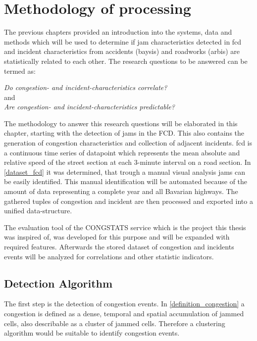\chapter{Methodology of processing}
\label{methodology}
The previous chapters provided an introduction into the systems, data and methods which will be used to determine if jam characteristics detected in \acrshort{fcd} and incident characteristics from accidents (\acrshort{baysis}) and roadworks (\acrshort{arbis}) are statistically related to each other. The research questions to be answered can be termed as:

\begin{center}
	\textit{Do congestion- and incident-characteristics correlate?} 
	\\
	\medskip
	and
	\medskip
	\\
	\textit{Are congestion- and incident-characteristics predictable?}
\end{center}

\medskip

The methodology to answer this research questions will be elaborated in this chapter, starting with the detection of jams in the FCD. This also contains the generation of congestion characteristics and collection of adjacent incidents. \acrshort{fcd} is a continuous time series of datapoint which represents the mean absolute and relative speed of the street section at each 3-minute interval on a road section. In \cref{dataset_fcd} it was determined, that trough a manual visual analysis jams can be easily identified. This manual identification will be automated because of the amount of data representing a complete year and all Bavarian highways. The gathered tuples of congestion and incident are then processed and exported into a unified data-structure. 

The evaluation tool of the CONGSTATS service which is the project this thesis was inspired of, was developed for this purpose and will be expanded with required features. Afterwards the stored dataset of congestion and incidents events will be analyzed for correlations and other statistic indicators.

\bigskip

\section{Detection Algorithm}
\label{methodology_detection}
The first step is the detection of congestion events. In \cref{definition_congestion} a congestion is defined as a dense, temporal and spatial accumulation of jammed cells, also describable as a cluster of jammed cells. Therefore a clustering algorithm would be suitable to identify congestion events.

